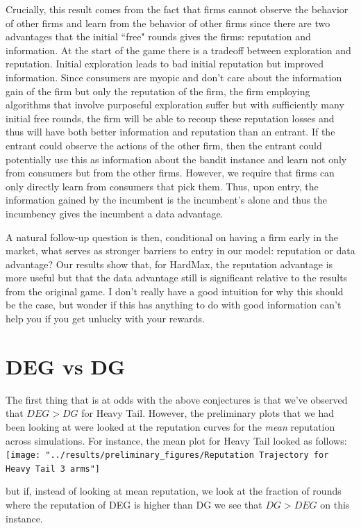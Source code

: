 \documentclass[11pt,letterpaper]{article}
\begin{document}
Crucially, this result comes from the fact that firms cannot observe the behavior of other firms and learn from the behavior of other firms since there are two advantages that the initial ``free" rounds gives the firms: reputation and information. At the start of the game there is a tradeoff between exploration and reputation. Initial exploration leads to bad initial reputation but improved information. Since consumers are myopic and don't care about the information gain of the firm but only the reputation of the firm, the firm employing algorithms that involve purposeful exploration suffer but with sufficiently many initial free rounds, the firm will be able to recoup these reputation losses and thus will have both better information and reputation than an entrant. If the entrant could observe the actions of the other firm, then the entrant could potentially use this as information about the bandit instance and learn not only from consumers but from the other firms. However, we require that firms can only directly learn from consumers that pick them. Thus, upon entry, the information gained by the incumbent is the incumbent's alone and thus the incumbency gives the incumbent a data advantage.

A natural follow-up question is then, conditional on having a firm early in the market, what serves as stronger barriers to entry in our model: reputation or data advantage? Our results show that, for HardMax, the reputation advantage is more useful but that the data advantage still is significant relative to the results from the original game. I don't really have a good intuition for why this should be the case, but wonder if this has anything to do with good information can't help you if you get unlucky with your rewards.

\section*{DEG vs DG}

The first thing that is at odds with the above conjectures is that we've observed that $DEG > DG$ for Heavy Tail. However, the preliminary plots that we had been looking at were looked at the reputation curves for the \textit{mean} reputation across simulations. For instance, the mean plot for Heavy Tail looked as follows: \\
\texttt{[image: "../results/preliminary\_figures/Reputation Trajectory for Heavy Tail 3 arms"]}

but if, instead of looking at mean reputation, we look at the fraction of rounds where the reputation of DEG is higher than DG we see that $DG > DEG$ on this instance.
\end{document}
